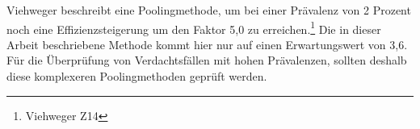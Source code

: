 Viehweger beschreibt eine Poolingmethode, um bei einer Prävalenz von 2 Prozent noch eine Effizienzsteigerung um den Faktor 5,0 zu erreichen.\footnote{Viehweger Z14}
Die in dieser Arbeit beschriebene Methode kommt hier nur auf einen Erwartungswert von 3,6.
Für die Überprüfung von Verdachtsfällen mit hohen Prävalenzen, sollten deshalb diese komplexeren Poolingmethoden geprüft werden.

